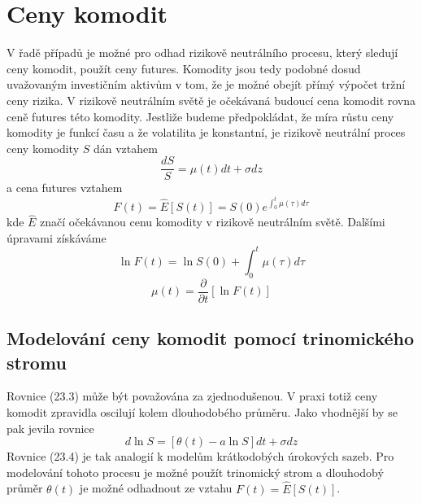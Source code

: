 \documentclass[a4paper]{book}
\begin{document}
\section{Ceny komodit}

V řadě případů je možné pro odhad rizikově neutrálního procesu, který sledují ceny komodit, použít ceny futures. Komodity jsou tedy podobné dosud uvažovaným investičním aktivům v tom, že je možné obejít přímý výpočet tržní ceny rizika. V rizikově neutrálním světě je očekávaná budoucí cena komodit rovna ceně futures této komodity. Jestliže budeme předpokládat, že míra růstu ceny komodity je funkcí času a že volatilita je konstantní, je rizikově neutrální proces ceny komodity $S$ dán vztahem
\begin{equation}
\frac{dS}{S} = \mu(t)dt + \sigma dz
\end{equation}
a cena futures vztahem
\begin{equation*}
F(t) = \hat{E}[S(t)] = S(0)e^{\int^t_0\mu(\tau)d\tau}
\end{equation*}
kde $\hat{E}$ značí očekávanou cenu komodity v rizikově neutrálním světě. Dalšími úpravami získáváme
\begin{equation*}
\ln F(t) = \ln S(0) + \int^t_0 \mu(\tau) d \tau
\end{equation*}
\begin{equation*}
\mu(t) = \frac{\partial}{\partial t}[\ln F(t)]
\end{equation*}

\subsection{Modelování ceny komodit pomocí trinomického stromu}

Rovnice (23.3) může být považována za zjednodušenou. V praxi totiž ceny komodit zpravidla oscilují kolem dlouhodobého průměru. Jako vhodnější by se pak jevila rovnice
\begin{equation}
d \ln S = [\theta(t) - a \ln S]dt + \sigma dz
\end{equation}
Rovnice (23.4) je tak analogií k modelům krátkodobých úrokových sazeb. Pro modelování tohoto procesu je možné použít trinomický strom a dlouhodobý průměr $\theta(t)$ je možné odhadnout ze vztahu $F(t) = \hat{E}[S(t)]$.\\
\end{document}
